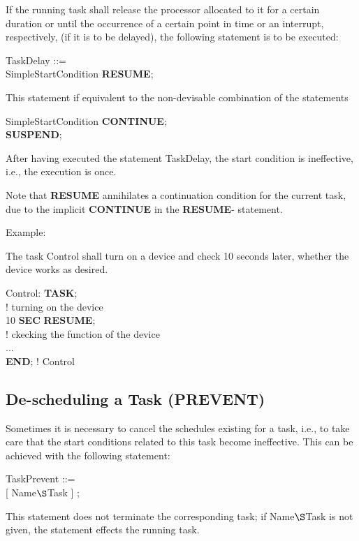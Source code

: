 If the running task shall release the processor allocated to it for a
certain duration or until the occurrence of a certain point in time or an
interrupt, respectively, (if it is to be delayed), the following
statement is to be executed:

TaskDelay ::= \\
\x SimpleStartCondition {\bf RESUME};

This statement if equivalent to the non-devisable combination of
the statements

SimpleStartCondition {\bf CONTINUE};\\
{\bf SUSPEND};

After having executed the statement TaskDelay, the start condition is
ineffective, i.e., the execution is once.

\begin{added}
Note that {\bf RESUME} annihilates a continuation condition
for the current task, due to the implicit {\bf CONTINUE} in the {\bf RESUME}-
statement.
\end{added}

Example:

The task Control shall turn on a device and check 10 seconds later,
whether the device works as desired.

\begin{tabbing}
Control: \= {\bf TASK};\\
  \> \x \x ! turning on the device\\
  \>  10 {\bf SEC} {\bf RESUME};\\
  \> \x \x ! ckecking the function of the device\\
  \> \x ...\\
  \> {\bf END}; ! Control
\end{tabbing}

\subsection{De-scheduling a Task (PREVENT)}    %

Sometimes it is necessary to cancel the schedules existing for a task,
i.e., to take care that the start conditions related to this task become
ineffective. This can be achieved with the following statement:

TaskPrevent ::= \\
 [ Name$\S $Task ] ;

This statement does not terminate the corresponding task; if
Name$\S $Task is not given, the statement effects the running task.

